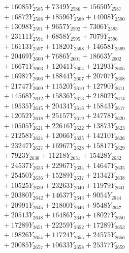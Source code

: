 \documentclass[a4paper,10pt]{article}
\begin{document}
{\begin{align}
&\;  + 16085 Y_{2585} + 7349 Y_{2586} + 15650 Y_{2587} \\[0.3ex]
&\;  + 16872 Y_{2588} + 18596 Y_{2589} + 14008 Y_{2590} \\[0.3ex]
&\;  + 13098 Y_{2591} + 9657 Y_{2592} + 7306 Y_{2593} \\[0.3ex]
&\;  + 23111 Y_{2594} + 6858 Y_{2595} + 7079 Y_{2596} \\[0.3ex]
&\;  + 16113 Y_{2597} + 11820 Y_{2598} + 14658 Y_{2599} \\[0.3ex]
&\;  + 20469 Y_{2600} + 7686 Y_{2601} + 18663 Y_{2602} \\[0.3ex]
&\;  + 16671 Y_{2603} + 12041 Y_{2604} + 21293 Y_{2605} \\[0.3ex]
&\;  + 16987 Y_{2606} + 18844 Y_{2607} + 20707 Y_{2608} \\[0.5ex]\allowbreak
&\;  + 21747 Y_{2609} + 11520 Y_{2610} + 12790 Y_{2611} \\[0.3ex]
&\;  + 14568 Y_{2612} + 15836 Y_{2613} + 21802 Y_{2614} \\[0.3ex]
&\;  + 19535 Y_{2615} + 20434 Y_{2616} + 15843 Y_{2617} \\[0.3ex]
&\;  + 12052 Y_{2618} + 25157 Y_{2619} + 24778 Y_{2620} \\[0.3ex]
&\;  + 10505 Y_{2621} + 22616 Y_{2622} + 13873 Y_{2623} \\[0.3ex]
&\;  + 21258 Y_{2624} + 12066 Y_{2625} + 14210 Y_{2626} \\[0.3ex]
&\;  + 23247 Y_{2627} + 16967 Y_{2628} + 15817 Y_{2629} \\[0.3ex]
&\;  + 7923 Y_{2630} + 11218 Y_{2631} + 15428 Y_{2632} \\[0.3ex]
&\;  + 24537 Y_{2633} + 22967 Y_{2634} + 14647 Y_{2635} \\[0.3ex]
&\;  + 25450 Y_{2636} + 15289 Y_{2637} + 21342 Y_{2638} \\[0.5ex]\allowbreak
&\;  + 10525 Y_{2639} + 23263 Y_{2640} + 11979 Y_{2641} \\[0.3ex]
&\;  + 20380 Y_{2642} + 14637 Y_{2643} + 9054 Y_{2644} \\[0.3ex]
&\;  + 20991 Y_{2645} + 21800 Y_{2646} + 9548 Y_{2647} \\[0.3ex]
&\;  + 20513 Y_{2648} + 16486 Y_{2649} + 18027 Y_{2650} \\[0.3ex]
&\;  + 17289 Y_{2651} + 22259 Y_{2652} + 17289 Y_{2653} \\[0.3ex]
&\;  + 19826 Y_{2654} + 11724 Y_{2655} + 24575 Y_{2656} \\[0.3ex]
&\;  + 20085 Y_{2657} + 10633 Y_{2658} + 25377 Y_{2659} \\[0.3ex]

\end{align}}
\end{document}
